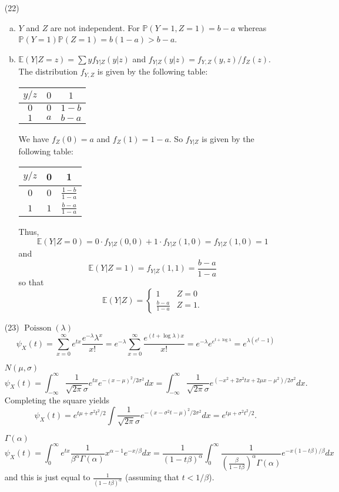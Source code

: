 \documentclass[10pt]{article}
\renewcommand{\P}{\mathbb{P}}
\newcommand{\E}{\mathbb{E}}
\newcommand{\Poiss}{\operatorname{Poisson}}
\begin{document}
\begin{enumerate}
\item[(22)]
\begin{enumerate}[(a)]
\item $Y$ and $Z$ are not independent. For $\P(Y=1,Z=1)=b-a$ whereas
$\P(Y=1)\P(Z=1) = b(1-a) > b-a$.
\item $\E(Y|Z=z) = \sum y f_{Y|Z}(y|z)$ and $f_{Y|Z}(y|z) = f_{Y,Z}(y,z)/f_Z(z)$.
The distribution $f_{Y,Z}$ is given by the following table:
\begin{center}
\begin{tabular}{c | c | c}
$y/z$ & $0$ & $1$ \\
\hline
$0$ & $0$ & $1-b$ \\
\hline
$1$ & $a$ & $b-a$
\end{tabular}
\end{center}

We have $f_Z(0)=a$ and $f_Z(1)=1-a$. So $f_{Y|Z}$ is given by the following table:
\begin{center}
\begin{tabular}{c | c | c}
$y/z$ & 0 & 1 \\
\hline
$0$ & $0$ & $\frac{1-b}{1-a}$ \\
\hline
$1$ & $1$ & $\frac{b-a}{1-a}$
\end{tabular}
\end{center}

Thus,
\[
\E(Y|Z=0) = 0 \cdot f_{Y|Z}(0,0) + 1 \cdot f_{Y|Z}(1,0) = f_{Y|Z}(1,0) = 1
\]
and
\[
\E(Y|Z=1) = f_{Y|Z}(1,1) = \frac{b-a}{1-a}
\]
so that
\[
\E(Y|Z) =
\begin{cases}
1 & Z = 0 \\
\frac{b-a}{1-a} & Z =1.
\end{cases}
\]
\end{enumerate}

\item[(23)]
\underline{$\Poiss(\lambda)$}
\[
\psi_X(t) = \sum_{x=0}^\infty e^{tx} \frac{e^{-\lambda}\lambda^x}{x!} =
e^{-\lambda} \sum_{x=0}^\infty \frac{e^{(t+\log\lambda)x}}{x!} =
e^{-\lambda}e^{e^{t+\log\lambda}}=e^{\lambda(e^t-1)}
\]

\underline{$N(\mu,\sigma)$}
\[
\psi_X(t) =
\int_{-\infty}^\infty \frac{1}{\sqrt{2\pi}\sigma} e^{tx}e^{-(x-\mu)^2/2\sigma^2}dx =
\int_{-\infty}^\infty \frac{1}{\sqrt{2\pi}\sigma} e^{(-x^2+2\sigma^2tx + 2\mu x -\mu^2)/2\sigma^2}dx.
\]
Completing the square yields
\[
\psi_X(t) = e^{t\mu + \sigma^2t^2/2} \int \frac{1}{\sqrt{2\pi}\sigma}
e^{-(x-\sigma^2t-\mu)^2/2\sigma^2}dx = e^{t\mu + \sigma^2t^2/2}.
\]

\underline{$\Gamma(\alpha)$}
\[
\psi_X(t) =
\int_0^\infty e^{tx} \frac{1}{\beta^\alpha \Gamma(\alpha)}x^{\alpha-1}e^{-x/\beta}dx =
\frac{1}{(1-t\beta)^\alpha}
\int_0^\infty \frac{1}{\left(\frac{\beta}{1-t\beta}\right)^\alpha \Gamma(\alpha)}
e^{-x(1-t\beta)/\beta}dx
\]
and this is just equal to $\frac{1}{(1-t\beta)^\alpha}$
(assuming that $t<1/\beta$).
\end{enumerate}
\end{document}
